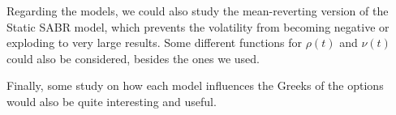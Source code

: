 Regarding the models, we could also study the mean-reverting version of the Static SABR model, which prevents the volatility from becoming negative or exploding to very large results. Some different functions for $\rho(t)$ and $\nu(t)$ could also be considered, besides the ones we used.


Finally, some study on how each model influences the Greeks of the options would also be quite interesting and useful.
